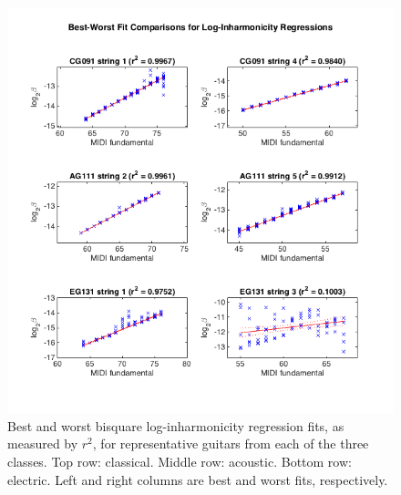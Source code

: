 \documentclass[12pt]{cmuthesis}
\begin{document}
\begin{figure}[!htbp] 
\label{fig:best-worst-r2}
\centering
\includegraphics[scale=0.75]{best-worst-r2}
\caption{Best and worst bisquare log-inharmonicity regression fits, as measured by $r^2$, for representative guitars from each of the three classes. Top row: classical. Middle row: acoustic. Bottom row: electric. Left and right columns are best and worst fits, respectively.}
\end{figure}
\end{document}
